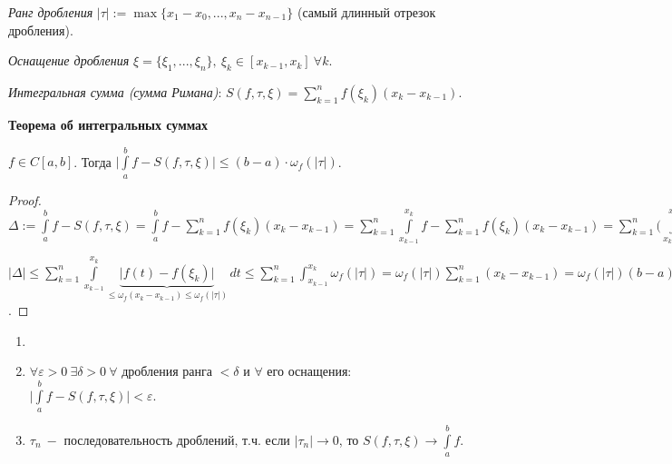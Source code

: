 \begin{definition}
    \textit{Ранг дробления} $|\tau|:=\max\{x_1-x_0, ..., x_n-x_{n-1}\}$ (самый длинный отрезок дробления).
\end{definition}

\begin{definition}
    \textit{Оснащение дробления} $\xi=\{\xi_1, ..., \xi_n\},\ \xi_k\in[x_{k-1}, x_k]\ \forall k$.
\end{definition}

\begin{definition}
    \textit{Интегральная сумма (сумма Римана)}: $S(f, \tau, \xi)=\sum\limits_{k=1}^n f(\xi_k)(x_k-x_{k-1})$.
\end{definition}

\begin{theorem} \textbf{Теорема об интегральных суммах}

    $f\in C[a, b]$. Тогда $\bigg|\int\limits_{a}^b f-S(f, \tau, \xi)\bigg|\leq (b-a)\cdot \omega_f(|\tau|)$.
\end{theorem}

\begin{proof}
    $\Delta:=\int\limits_{a}^b f-S(f, \tau, \xi)
    =\int\limits_{a}^b f-\sum\limits_{k=1}^n f(\xi_k)(x_k-x_{k-1}) 
    =\sum\limits_{k=1}^n \int\limits_{x_{k-1}}^{x_k} f-\sum\limits_{k=1}^n f(\xi_k)(x_k-x_{k-1})
    =\sum\limits_{k=1}^n \bigg(\int\limits_{x_{k-1}}^{x_k} f- f(\xi_k)(x_k-x_{k-1})\bigg)
    =\sum\limits_{k=1}^n \int\limits_{x_{k-1}}^{x_k} \bigg(f(t)-f(\xi_k)\bigg)\,dt$

    $|\Delta|\leq \sum\limits_{k=1}^n \int\limits_{x_{k-1}}^{x_k} \underbrace{\bigg|f(t)-f(\xi_k)\bigg|}_{\leq\omega_f(x_k-x_{k-1})\leq \omega_f(|\tau|)}\,dt\leq \sum\limits_{k=1}^n \int_{x_{k-1}}^{x_k} \omega_f(|\tau|)=\omega_f(|\tau|)\sum\limits_{k=1}^n(x_k-x_{k-1})=\omega_f(|\tau|)(b-a)$.
\end{proof}

\begin{corollary}
    \begin{enumerate}
        \item[]
        \item $\forall\varepsilon>0\ \exists \delta>0\ \forall$ дробления ранга $<\delta$ и $\forall$ его оснащения: $\bigg|\int\limits_{a}^b f-S(f, \tau, \xi)\bigg|<\varepsilon$.
        \item $\tau_n\ -$ последовательность дроблений, т.ч. если $|\tau_n|\rightarrow 0$, то $S(f, \tau, \xi)\rightarrow \int\limits_{a}^b f$.
    \end{enumerate}
\end{corollary}


